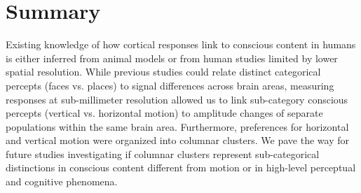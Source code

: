 \chapter{Summary}
Existing knowledge of how cortical responses link to conscious content in humans is either inferred from animal models or from human studies limited by lower spatial resolution. While previous studies could relate distinct categorical percepts (faces vs. places) to signal differences across brain areas, measuring responses at sub-millimeter resolution allowed us to link sub-category conscious percepts (vertical vs. horizontal motion) to amplitude changes of separate populations within the same brain area. Furthermore, preferences for horizontal and vertical motion were organized into columnar clusters. We pave the way for future studies investigating if columnar clusters represent sub-categorical distinctions in conscious content different from motion or in high-level perceptual and cognitive phenomena.